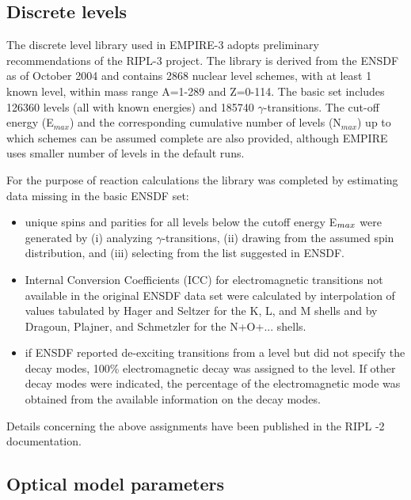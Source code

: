 \subsection{Discrete levels}

The discrete level library used in EMPIRE-3 adopts preliminary
recommendations of the RIPL-3 project. The library is derived from the ENSDF
as of October 2004 and contains 2868 nuclear level schemes, with at least 1
known level, within mass range A=1-289 and Z=0-114. The basic set includes
126360 levels (all with known energies) and 185740 $\gamma$-transitions. The
cut-off energy (E$_{{max}}$) and the corresponding cumulative number of
levels (N$_{{max}}$) up to which schemes can be assumed complete are also
provided, although EMPIRE uses smaller number of levels in the default runs.

For the purpose of reaction calculations the library was completed by
estimating data missing in the basic ENSDF set:

\begin{itemize}
\item unique spins and parities for all levels below the cutoff energy E$_{{%
max}}$ were generated by (i) analyzing $\gamma$-transitions, (ii) drawing
from the assumed spin distribution, and (iii) selecting from the list
suggested in ENSDF.

\item Internal Conversion Coefficients (ICC) for electromagnetic transitions
not available in the original ENSDF data set were calculated by
interpolation of values tabulated by Hager and Seltzer for the K, L, and M
shells and by Dragoun, Plajner, and Schmetzler for the N+O+... shells.

\item if ENSDF reported de-exciting transitions from a level but did not
specify the decay modes, 100\% electromagnetic decay was assigned to the
level. If other decay modes were indicated, the percentage of the
electromagnetic mode was obtained from the available information on the
decay modes.
\end{itemize}

Details concerning the above assignments have been published in the RIPL%
-2 documentation.

\subsection{Optical model parameters\label{sec:RIPLomp}}

